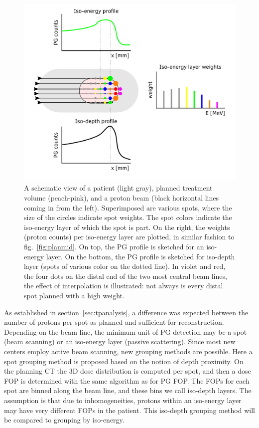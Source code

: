 \documentclass[a4paper,english]{article}
\begin{document}
\begin{figure}[htp]
  \centering
  \includegraphics[width=0.6\linewidth]{planning}
  \caption{A schematic view of a patient (light gray), planned treatment volume (peach-pink), and a proton beam (black horizontal lines coming in from the left). Superimposed are various spots, where the size of the circles indicate spot weights. The spot colors indicate the iso-energy layer of which the spot is part. On the right, the weights (proton counts) per iso-energy layer are plotted, in similar fashion to fig.~\ref{fig:planmid}. On top, the PG profile is sketched for an iso-energy layer. On the bottom, the PG profile is sketched for iso-depth layer (spots of various color on the dotted line). In violet and red, the four dots on the distal end of the two most central beam lines, the effect of interpolation is illustrated: not always is every distal spot planned with a high weight.}
  \label{fig:planning}
\end{figure}

As established in section~\ref{sec:tpanalysis}, a difference was expected between the number of protons per spot as planned and sufficient for reconstruction. Depending on the beam line, the minimum unit of PG detection may be a spot (beam scanning) or an iso-energy layer (passive scattering). Since most new centers employ active beam scanning, new grouping methods are possible. Here a spot grouping method is proposed based on the notion of depth proximity. On the planning CT the 3D dose distribution is computed per spot, and then a dose FOP is determined with the same algorithm as for PG FOP. The FOPs for each spot are binned along the beam line, and these bins we call iso-depth layers. The assumption is that due to inhomogeneities, protons within an iso-energy layer may have very different FOPs in the patient. This iso-depth grouping method will be compared to grouping by iso-energy.
\end{document}
